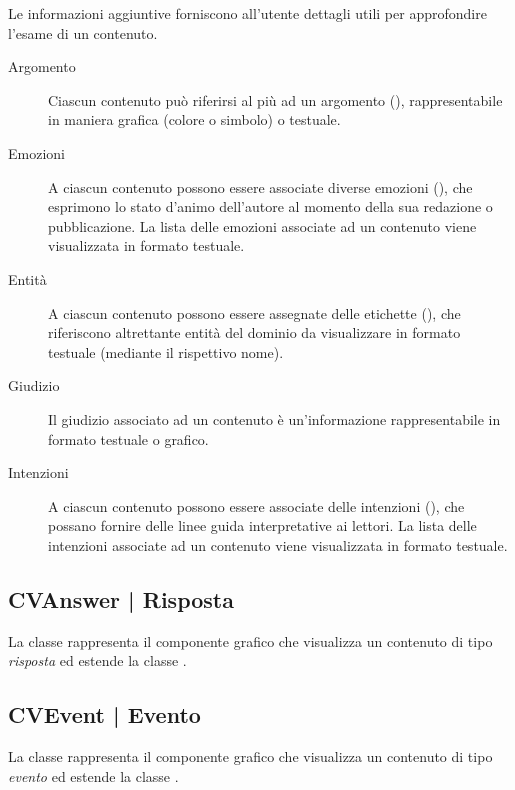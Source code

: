 \documentclass[10pt,a4paper,headinclude,footinclude,hidelinks]{scrreprt} %
\begin{document}
	Le informazioni aggiuntive forniscono all'utente dettagli utili per approfondire l'esame di un contenuto.
	\begin{description}
	\item[Argomento] Ciascun contenuto può riferirsi al più ad un argomento (\textit{}), rappresentabile in maniera grafica (colore o simbolo) o testuale.
	\item[Emozioni] A ciascun contenuto possono essere associate diverse emozioni (\textit{}), che esprimono lo stato d'animo dell'autore al momento della sua redazione o pubblicazione. La lista delle emozioni associate ad un contenuto viene visualizzata in formato testuale.
	\item[Entit\`a] A ciascun contenuto possono essere assegnate delle etichette (\textit{}), che riferiscono altrettante entità del dominio da visualizzare in formato testuale (mediante il rispettivo nome).
	\item[Giudizio] Il giudizio associato ad un contenuto è un'informazione rappresentabile in formato testuale o grafico.
	\item[Intenzioni] A ciascun contenuto possono essere associate delle intenzioni (\textit{}), che possano fornire delle linee guida interpretative ai lettori. La lista delle intenzioni associate ad un contenuto viene visualizzata in formato testuale.
	\end{description}

	\subsection[CVAnswer]{CVAnswer | Risposta}
	\label{sec:stage:design:view:answer}
	La classe \textit{} rappresenta il componente grafico che visualizza un contenuto di tipo \textit{risposta} ed estende la classe \textit{}.

	\subsection[CVEvent]{CVEvent | Evento}
	\label{sec:stage:design:view:event}
	La classe \textit{} rappresenta il componente grafico che visualizza un contenuto di tipo \textit{evento} ed estende la classe \textit{}.
\end{document}
